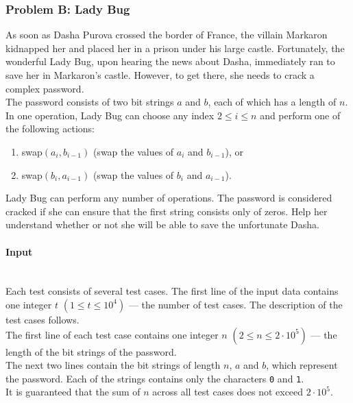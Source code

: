 \documentclass{article}
\begin{document}
\subsubsection{Problem B: Lady Bug}

As soon as Dasha Purova crossed the border of France, the villain Markaron kidnapped her and placed her in a prison under his large castle. Fortunately, the wonderful Lady Bug, upon hearing the news about Dasha, immediately ran to save her in Markaron's castle. However, to get there, she needs to crack a complex password.\\

The password consists of two bit strings $a$ and $b$, each of which has a length of $n$. In one operation, Lady Bug can choose any index $2 \le i \le n$ and perform one of the following actions:
\begin{enumerate}
    \item swap$(a_i, b_{i-1})$ (swap the values of $a_i$ and $b_{i-1}$), or
    \item swap$(b_i, a_{i-1})$ (swap the values of $b_i$ and $a_{i-1}$).
\end{enumerate}

Lady Bug can perform any number of operations. The password is considered cracked if she can ensure that the first string consists only of zeros. Help her understand whether or not she will be able to save the unfortunate Dasha.

\paragraph{Input} \mbox{} \\

Each test consists of several test cases. The first line of the input data contains one integer $t$ $(1 \le t \le 10^4)$ — the number of test cases. The description of the test cases follows.\\

The first line of each test case contains one integer $n$ $(2 \le n \le 2 \cdot 10^5)$ — the length of the bit strings of the password.\\

The next two lines contain the bit strings of length $n$, $a$ and $b$, which represent the password. Each of the strings contains only the characters \texttt{0} and \texttt{1}.\\

It is guaranteed that the sum of $n$ across all test cases does not exceed $2 \cdot 10^5$.
\end{document}
